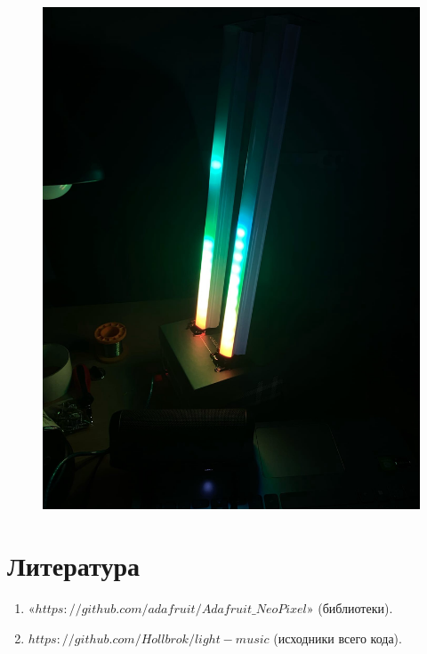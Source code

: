 \documentclass[a4paper, 12pt]{article}%
\begin{document}
\begin{figure}[!h]
\begin{center}
\includegraphics[scale=0.25]{pictures/bea2.jpg}
\end{center}
\end{figure}

\section{Литература}


\begin{enumerate}

\item $«https://github.com/adafruit/Adafruit\_NeoPixel»$  (библиотеки).

\item $https://github.com/Hollbrok/light-music$ (исходники всего кода).

\end{enumerate}	
\end{document}
